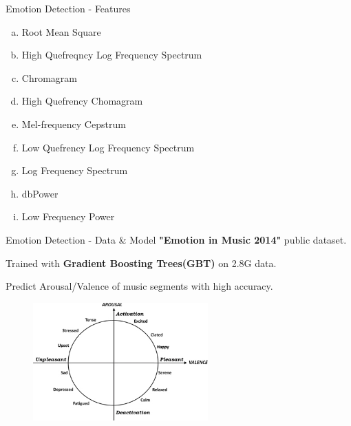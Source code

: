 \begin{frame}{Emotion Detection - Features}
\begin{enumerate}[(a)]
    \item Root Mean Square
    \item High Quefreqncy Log Frequency Spectrum
    \item Chromagram
    \item High Quefrency Chomagram
    \item Mel-frequency Cepstrum
    \item Low Quefrency Log Frequency Spectrum
    \item Log Frequency Spectrum
    \item dbPower
    \item Low Frequency Power
\end{enumerate}
\end{frame}

\begin{frame}{Emotion Detection - Data \& Model}
       \textbf{"Emotion in Music 2014"} public dataset.

     Trained with \textbf{Gradient Boosting Trees(GBT)} on 2.8G data.

     Predict Arousal/Valence of music segments with high accuracy.
\begin{figure}[H]
  \centering
  \includegraphics[width=0.6\textwidth]{res/av.jpg}
\end{figure}

\end{frame}


